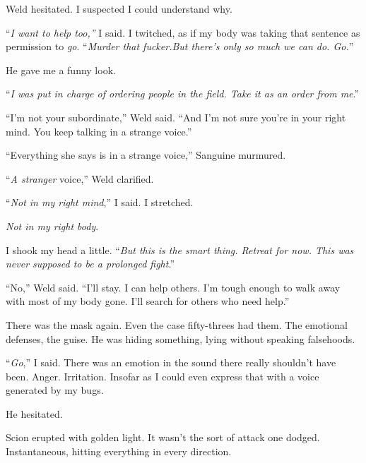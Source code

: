 Weld hesitated.  I suspected I could understand why.



``\emph{I want to help too,''  }I said.  I twitched, as if my body was taking that sentence as permission to \emph{go}.  ``\emph{Murder that fucker.}\emph{But there's only so much we can do.  Go.}''



He gave me a funny look.



``\emph{I was put in charge of ordering people in the field.  Take it as an order from me}.''



``I'm not your subordinate,'' Weld said.  ``And I'm not sure you're in your right mind.  You keep talking in a strange voice.''



``Everything she says is in a strange voice,'' Sanguine murmured.



``\emph{A stranger} voice,'' Weld clarified.



``\emph{Not in my right mind},'' I said.  I stretched.



\emph{Not in my right body}.



I shook my head a little.  ``\emph{But this is the smart thing.  Retreat for now.  This was never supposed to be a prolonged fight}.''



``No,'' Weld said.  ``I'll stay.  I can help others.  I'm tough enough to walk away with most of my body gone.  I'll search for others who need help.''



There was the mask again.  Even the case fifty-threes had them.  The emotional defenses, the guise.  He was hiding something, lying without speaking falsehoods.



``\emph{Go},'' I said.  There was an emotion in the sound there really shouldn't have been.  Anger.  Irritation.  Insofar as I could even express that with a voice generated by my bugs.



He hesitated.



Scion erupted with golden light.  It wasn't the sort of attack one dodged.  Instantaneous, hitting everything in every direction.



